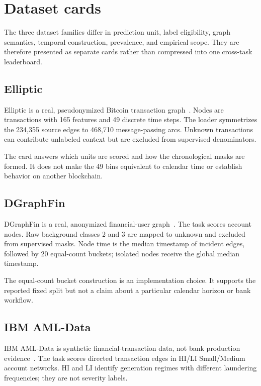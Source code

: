 \section{Dataset cards}
\label{sec:s-datasets}

The three dataset families differ in prediction unit, label eligibility, graph semantics, temporal construction, prevalence, and empirical scope. They are therefore presented as separate cards rather than compressed into one cross-task leaderboard.

\subsection{Elliptic}

Elliptic is a real, pseudonymized Bitcoin transaction graph~\cite{weber2019aml}. Nodes are transactions with 165 features and 49 discrete time steps. The loader symmetrizes the 234,355 source edges to 468,710 message-passing arcs. Unknown transactions can contribute unlabeled context but are excluded from supervised denominators.



The card answers which units are scored and how the chronological masks are formed. It does not make the 49 bins equivalent to calendar time or establish behavior on another blockchain.

\subsection{DGraphFin}

DGraphFin is a real, anonymized financial-user graph~\cite{huang2022dgraph}. The task scores account nodes. Raw background classes 2 and 3 are mapped to unknown and excluded from supervised masks. Node time is the median timestamp of incident edges, followed by 20 equal-count buckets; isolated nodes receive the global median timestamp.



The equal-count bucket construction is an implementation choice. It supports the reported fixed split but not a claim about a particular calendar horizon or bank workflow.

\subsection{IBM AML-Data}

IBM AML-Data is synthetic financial-transaction data, not bank production evidence~\cite{altman2023ibmaml}. The task scores directed transaction edges in HI/LI Small/Medium account networks. HI and LI identify generation regimes with different laundering frequencies; they are not severity labels.

